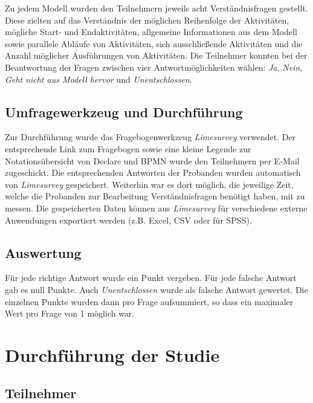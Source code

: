 Zu jedem Modell wurden den Teilnehmern jeweils acht Verständnisfragen gestellt. Diese zielten auf das Verständnis der möglichen Reihenfolge der Aktivitäten, mögliche Start- und Endaktivitäten, allgemeine Informationen aus dem Modell sowie parallele Abläufe von Aktivitäten, sich ausschließende Aktivitäten und die Anzahl möglicher Ausführungen von Aktivitäten.\newline
Die Teilnehmer konnten bei der Beantwortung der Fragen zwischen vier Antwortmöglichkeiten wählen: \textit{Ja}, \textit{Nein}, \textit{Geht nicht aus Modell hervor} und \textit{Unentschlossen}.

\subsection{Umfragewerkzeug und Durchführung}

Zur Durchführung wurde das Fragebogenwerkzeug \textit{Limesurvey} verwendet. Der entsprechende Link zum Fragebogen sowie eine kleine Legende zur Notationsübersicht von Declare und BPMN wurde den Teilnehmern per E-Mail zugeschickt. Die entsprechenden Antworten der Probanden wurden automatisch von \textit{Limesurvey} gespeichert. Weiterhin war es dort möglich, die jeweilige Zeit, welche die Probanden zur Bearbeitung Verständnisfragen benötigt haben, mit zu messen. Die gespeicherten Daten können aus \textit{Limesurvey} für verschiedene externe Anwendungen exportiert werden (z.B. Excel, CSV oder für SPSS).

\subsection{Auswertung}

Für jede richtige Antwort wurde ein Punkt vergeben. Für jede falsche Antwort gab es null Punkte. Auch \textit{Unentschlossen} wurde als falsche Antwort gewertet. Die einzelnen Punkte wurden dann pro Frage aufsummiert, so dass ein maximaler Wert pro Frage von 1 möglich war.

\section{Durchführung der Studie}

\subsection{Teilnehmer}

